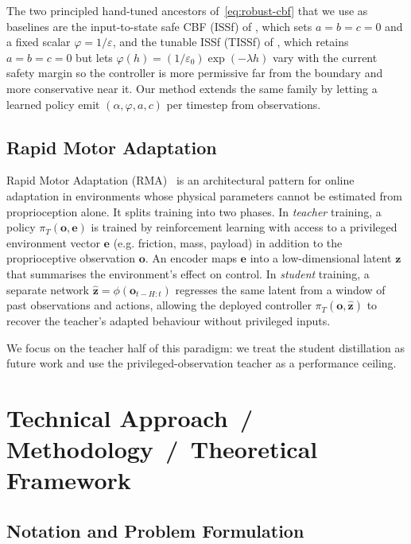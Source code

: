 \documentclass{article}
\newcommand{\bo}{\mathbf{o}}
\newcommand{\bz}{\mathbf{z}}
\begin{document}
The two principled hand-tuned ancestors of~\eqref{eq:robust-cbf} that we use as
baselines are the input-to-state safe CBF (ISSf) of
\citep{kolathaya2018input}, which sets $a=b=c=0$ and a fixed scalar
$\varphi = 1/\varepsilon$, and the tunable ISSf (TISSf) of
\citep{cosner2022safety}, which retains $a=b=c=0$ but lets
$\varphi(h) = (1/\varepsilon_0)\exp(-\lambda h)$ vary with the current safety
margin so the controller is more permissive far from the boundary and more
conservative near it. Our method extends the same family by letting a learned
policy emit $(\alpha,\varphi,a,c)$ per timestep from observations.

\subsection{Rapid Motor Adaptation}

Rapid Motor Adaptation (RMA)~\citep{kumar2021rma} is an architectural pattern
for online adaptation in environments whose physical parameters cannot be
estimated from proprioception alone. It splits training into two phases. In
\emph{teacher} training, a policy $\pi_T(\bo,\mathbf{e})$ is trained by
reinforcement learning with access to a privileged environment vector
$\mathbf{e}$ (e.g. friction, mass, payload) in addition to the proprioceptive
observation $\bo$. An encoder maps $\mathbf{e}$ into a low-dimensional latent
$\bz$ that summarises the environment's effect on control. In \emph{student}
training, a separate network $\hat{\bz}=\phi(\bo_{t-H:t})$ regresses the same
latent from a window of past observations and actions, allowing the deployed
controller $\pi_T(\bo,\hat{\bz})$ to recover the teacher's adapted behaviour
without privileged inputs.

We focus on the teacher half of this paradigm: we treat the student
distillation as future work and use the privileged-observation teacher as a
performance ceiling.

\section{Technical Approach \,/\, Methodology \,/\, Theoretical Framework}
\label{sec:method}

\subsection{Notation and Problem Formulation}
\end{document}
